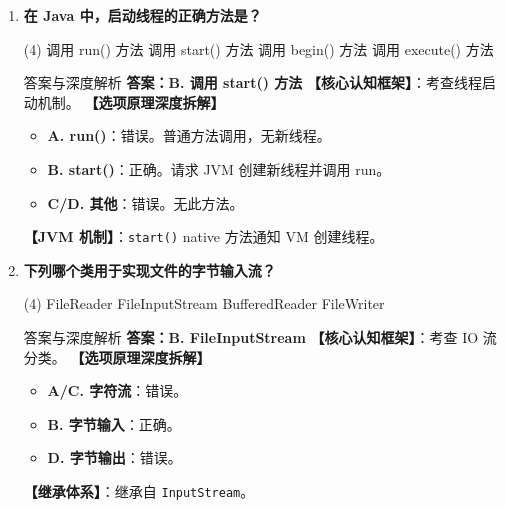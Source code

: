 ﻿\documentclass[12pt, a4paper]{ctexart}
\newcommand{\code}[1]{\texttt{#1}}
\begin{document}
\begin{enumerate}[label=\textbf{\arabic*.}, itemsep=1em]
	\item \textbf{在 Java 中，启动线程的正确方法是？}
	      \begin{tasks}(4)
		      \task 调用 run() 方法 \task 调用 start() 方法 \task 调用 begin() 方法 \task 调用 execute() 方法
	      \end{tasks}
	      \begin{bluebox}{答案与深度解析}
		      \textbf{答案：B. 调用 start() 方法}
		      \textbf{【核心认知框架】}：考查线程启动机制。
		      \textbf{【选项原理深度拆解】}
		      \begin{itemize}[leftmargin=*, nosep]
			      \item \textbf{A. run()}：错误。普通方法调用，无新线程。
			      \item \textbf{B. start()}：正确。请求 JVM 创建新线程并调用 run。
			      \item \textbf{C/D. 其他}：错误。无此方法。
		      \end{itemize}
		      \textbf{【JVM 机制】}：\code{start()}  native 方法通知 VM 创建线程。
	      \end{bluebox}

	\item \textbf{下列哪个类用于实现文件的字节输入流？}
	      \begin{tasks}(4)
		      \task FileReader \task FileInputStream \task BufferedReader \task FileWriter
	      \end{tasks}
	      \begin{bluebox}{答案与深度解析}
		      \textbf{答案：B. FileInputStream}
		      \textbf{【核心认知框架】}：考查 IO 流分类。
		      \textbf{【选项原理深度拆解】}
		      \begin{itemize}[leftmargin=*, nosep]
			      \item \textbf{A/C. 字符流}：错误。
			      \item \textbf{B. 字节输入}：正确。
			      \item \textbf{D. 字节输出}：错误。
		      \end{itemize}
		      \textbf{【继承体系】}：继承自 \code{InputStream}。
	      \end{bluebox}


\end{enumerate}
\end{document}
